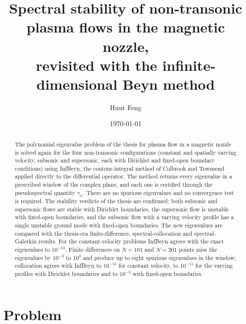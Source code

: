 \documentclass[11pt]{article}
\title{Spectral stability of non-transonic plasma flows in the magnetic nozzle,\\
revisited with the infinite-dimensional Beyn method}
\author{Hunt Feng}
\date{\today}
\newcommand{\infbeyn}{InfBeyn}
\begin{document}
\maketitle

\begin{abstract}
The polynomial eigenvalue problem of the thesis \cite{feng2024} for plasma flow in a magnetic nozzle is
solved again for the four non-transonic configurations (constant and spatially varying velocity, subsonic
and supersonic, each with Dirichlet and fixed-open boundary conditions) using \infbeyn{}, the contour-integral
method of Colbrook and Townsend \cite{colbrook2023} applied directly to the differential operator. The
method returns every eigenvalue in a prescribed window of the complex plane, and each one is certified
through the pseudospectral quantity $\gamma_n$. There are no spurious eigenvalues and no convergence test
is required. The stability verdicts of the thesis are confirmed: both subsonic and supersonic flows are
stable with Dirichlet boundaries, the supersonic flow is unstable with fixed-open boundaries, and the
subsonic flow with a varying velocity profile has a single unstable ground mode with fixed-open boundaries.
The new eigenvalues are compared with the thesis-era finite-difference, spectral-collocation and
spectral-Galerkin results. For the constant-velocity problems \infbeyn{} agrees with the exact eigenvalues to
$10^{-13}$. Finite differences on $N=101$ and $N=201$ points miss the eigenvalues by $10^{-3}$ to $10^{0}$
and produce up to eight spurious eigenvalues in the window; collocation agrees with \infbeyn{} to
$10^{-13}$ for constant velocity, to $10^{-11}$ for the varying profiles with Dirichlet boundaries and to
$10^{-3}$ with fixed-open boundaries.
\end{abstract}

\section{Problem}
\end{document}
